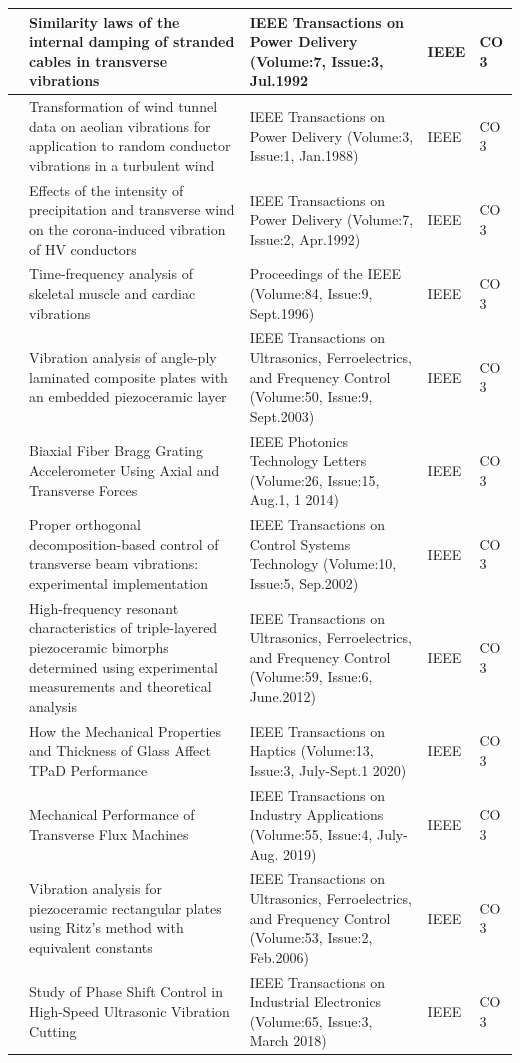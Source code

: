 \documentclass[11pt,paper=a4,answers]{exam}
\begin{document}
\begin{flushleft}
\begin{longtable}{|>{\centering\arraybackslash}p{1.4cm}  |  >{\raggedright\arraybackslash}p{6cm} |>{\centering\arraybackslash}p{3.75cm}|>{\centering\arraybackslash}p{2cm} |>{\centering\arraybackslash}p{2cm} |}
110&Similarity laws of the internal damping of stranded cables in transverse vibrations&IEEE Transactions on Power Delivery (Volume:7, Issue:3, Jul.1992&IEEE&CO 3\\\hline
111&Transformation of wind tunnel data on aeolian vibrations for application to random conductor vibrations in a turbulent wind&IEEE Transactions on Power Delivery (Volume:3, Issue:1, Jan.1988)&IEEE&CO 3\\\hline
112&Effects of the intensity of precipitation and transverse wind on the corona-induced vibration of HV conductors&IEEE Transactions on Power Delivery (Volume:7, Issue:2, Apr.1992)&IEEE&CO 3\\\hline
113&Time-frequency analysis of skeletal muscle and cardiac vibrations&Proceedings of the IEEE (Volume:84, Issue:9, Sept.1996)&IEEE&CO 3\\\hline
114&Vibration analysis of angle-ply laminated composite plates with an embedded piezoceramic layer&IEEE Transactions on Ultrasonics, Ferroelectrics, and Frequency Control (Volume:50, Issue:9, Sept.2003)&IEEE&CO 3\\\hline
115&Biaxial Fiber Bragg Grating Accelerometer Using Axial and Transverse Forces&IEEE Photonics Technology Letters (Volume:26, Issue:15, Aug.1, 1 2014)&IEEE&CO 3\\\hline
116&Proper orthogonal decomposition-based control of transverse beam vibrations: experimental implementation&IEEE Transactions on Control Systems Technology (Volume:10, Issue:5, Sep.2002)&IEEE&CO 3\\\hline
117&High-frequency resonant characteristics of triple-layered piezoceramic bimorphs determined using experimental measurements and theoretical analysis&IEEE Transactions on Ultrasonics, Ferroelectrics, and Frequency Control (Volume:59, Issue:6, June.2012)&IEEE&CO 3\\\hline
118&How the Mechanical Properties and Thickness of Glass Affect TPaD Performance&IEEE Transactions on Haptics (Volume:13, Issue:3, July-Sept.1 2020)&IEEE&CO 3\\\hline
119&Mechanical Performance of Transverse Flux Machines&IEEE Transactions on Industry Applications (Volume:55, Issue:4, July-Aug. 2019)&IEEE&CO 3\\\hline
120&Vibration analysis for piezoceramic rectangular plates using Ritz's method with equivalent constants&IEEE Transactions on Ultrasonics, Ferroelectrics, and Frequency Control (Volume:53, Issue:2, Feb.2006)&IEEE&CO 3\\\hline
121&Study of Phase Shift Control in High-Speed Ultrasonic Vibration Cutting&IEEE Transactions on Industrial Electronics (Volume:65, Issue:3, March 2018)&IEEE&CO 3\\\hline

\end{longtable}
\end{flushleft}
\end{document}
